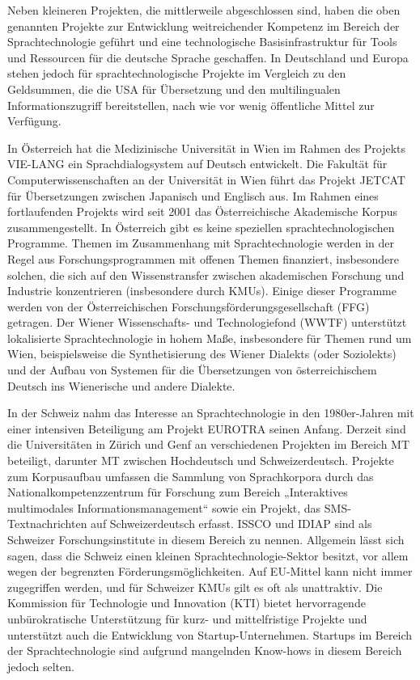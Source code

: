 \documentclass[]{../../metanetpaper}
\begin{document}
\begin{Parallel}[c]{80mm}{80mm}
{Neben kleineren Projekten, die mittlerweile abgeschlossen sind, haben die oben genannten Projekte zur Entwicklung weitreichender Kompetenz im Bereich der Sprachtechnologie geführt und eine technologische Basisinfrastruktur für Tools und Ressourcen für die deutsche Sprache geschaffen. In Deutschland und Europa stehen jedoch für sprachtechnologische Projekte im Vergleich zu den Geldsummen, die die USA für Übersetzung und den multilingualen Informationszugriff bereitstellen, nach wie vor wenig öffentliche Mittel zur Verfügung. 

In Österreich hat die Medizinische Universität in Wien im Rahmen des Projekts VIE-LANG ein Sprachdialogsystem auf Deutsch entwickelt. Die Fakultät für Computerwissenschaften an der Universität in Wien führt das Projekt JETCAT für Übersetzungen zwischen Japanisch und Englisch aus. Im Rahmen eines fortlaufenden Projekts wird seit 2001 das Österreichische Akademische Korpus zusammengestellt. In Österreich gibt es keine speziellen sprachtechnologischen Programme. Themen im Zusammenhang mit Sprachtechnologie werden in der Regel aus Forschungsprogrammen mit offenen Themen finanziert, insbesondere solchen, die sich auf den Wissenstransfer zwischen akademischen Forschung und Industrie konzentrieren (insbesondere durch KMUs). Einige dieser Programme werden von der Österreichischen Forschungsförderungsgesellschaft (FFG) getragen. Der Wiener Wissenschafts- und Technologiefond (WWTF) unterstützt lokalisierte Sprachtechnologie in hohem Maße, insbesondere für Themen rund um Wien, beispielsweise die Synthetisierung des Wiener Dialekts (oder Soziolekts) und der Aufbau von Systemen für die Übersetzungen von österreichischem Deutsch ins Wienerische und andere Dialekte. 

In der Schweiz nahm das Interesse an Sprachtechnologie in den 1980er-Jahren mit einer intensiven Beteiligung am Projekt EUROTRA seinen Anfang. Derzeit sind die Universitäten in Zürich und Genf an verschiedenen Projekten im Bereich MT beteiligt, darunter MT zwischen Hochdeutsch und Schweizerdeutsch. Projekte zum Korpusaufbau umfassen die Sammlung von Sprachkorpora durch das Nationalkompetenzzentrum für Forschung zum Bereich „Interaktives multimodales Informationsmanagement“ sowie ein Projekt, das SMS-Textnachrichten auf Schweizerdeutsch erfasst. ISSCO und IDIAP sind als Schweizer Forschungsinstitute in diesem Bereich zu nennen. Allgemein lässt sich sagen, dass die Schweiz einen kleinen Sprachtechnologie-Sektor besitzt, vor allem wegen der begrenzten Förderungsmöglichkeiten. Auf EU-Mittel kann nicht immer zugegriffen werden, und für Schweizer KMUs gilt es oft als unattraktiv. Die Kommission für Technologie und Innovation (KTI) bietet hervorragende unbürokratische Unterstützung für kurz- und mittelfristige Projekte und unterstützt auch die Entwicklung von Startup-Unternehmen. Startups im Bereich der Sprachtechnologie sind aufgrund mangelnden Know-hows in diesem Bereich jedoch selten.

}
\end{Parallel}
\end{document}
